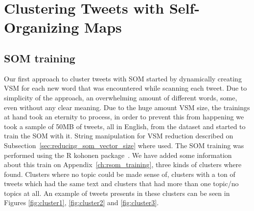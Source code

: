 \label{ch:eval_met}

\section{Clustering Tweets with Self-Organizing Maps}

\subsection{SOM training}
\label{sub:clustering_tweets_with_soms}
Our first approach to cluster tweets with \ac{SOM} started by dynamically creating \ac{VSM} for each new word that was encountered while scanning each tweet. Due to simplicity of the approach, an overwhelming amount of different words, some, even without any clear meaning. 
Due to the huge amount \ac{VSM} size, the trainings at hand took an eternity to process, in order to prevent this from happening we took a sample of 50MB of tweets, all in English, from the dataset and started to train the \ac{SOM} with it. String manipulation for \ac{VSM} reduction described on Subsection~\ref{sec:reducing_som_vector_size} where used.
The \ac{SOM} training was performed using the R kohonen package~\cite{rsom}. We have added some information about this train on Appendix~\ref{ch:rsom_training}, three kinds of clusters where found. Clusters where no topic could be made sense of, clusters with a ton of tweets which had the same text and clusters that had more than one topic/no topics at all. An example of tweets presents in these clusters can be seen in Figures \ref{fig:cluster1}, \ref{fig:cluster2} and \ref{fig:cluster3}.   

